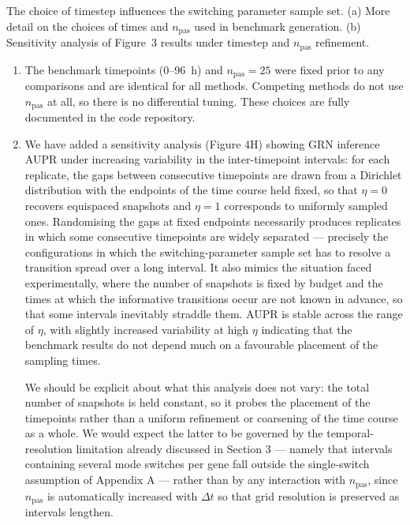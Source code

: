 \documentclass[11pt,a4paper]{article}
\newcounter{revtotal}   %
\newcounter{revlocal}   %
\newcommand{\currentreviewer}{}  %
\newcommand{\revcomment}[2]{%
  \stepcounter{revtotal}%
  \stepcounter{revlocal}%
  \edef\commentlabel{\currentreviewer.\arabic{revlocal}}%
  \begin{tcolorbox}[revstyle,
      title={\commentlabel\ $|$\ #1}]
    #2
  \end{tcolorbox}%
  \edef\lastcommentlabel{\commentlabel}%
}
\newcommand{\response}[1]{%
  \begin{tcolorbox}[respstyle,
      title={Response to \lastcommentlabel}]
    #1
  \end{tcolorbox}%
}
\begin{document}
\revcomment{Potential bias from timestep choice in benchmarks}{%
The choice of timestep influences the switching parameter sample set. (a) More detail on
the choices of times and $n_{\mathrm{pas}}$ used in benchmark generation. (b) Sensitivity
analysis of Figure~3 results under timestep and $n_{\mathrm{pas}}$ refinement.}
\response{%
\begin{enumerate}[label=(\alph*)]
  \item The benchmark timepoints (0--96~h) and $n_{\mathrm{pas}} = 25$ were fixed prior to
        any comparisons and are identical for all methods. Competing methods do not use
        $n_{\mathrm{pas}}$ at all, so there is no differential tuning. These choices are
        fully documented in the code repository.
  \item We have added a sensitivity analysis (Figure 4H) showing GRN inference AUPR
  under increasing variability in the inter-timepoint intervals: for each replicate, the gaps
  between consecutive timepoints are drawn from a Dirichlet distribution with the endpoints
  of the time course held fixed, so that $\eta = 0$ recovers equispaced snapshots and
  $\eta = 1$ corresponds to uniformly sampled ones. Randomising the gaps
  at fixed endpoints necessarily produces replicates in which some consecutive timepoints
  are widely separated — precisely the configurations in which the switching-parameter
  sample set has to resolve a transition spread over a long interval.
  It also mimics the situation faced experimentally, where the number of snapshots is fixed
  by budget and the times at which the informative transitions occur are not known in
  advance, so that some intervals inevitably straddle them. AUPR is stable across the range of $\eta$, with slightly increased variability at high $\eta$ indicating that the benchmark results do not depend much on a favourable
  placement of the sampling times.

  We should be explicit about what this analysis does not vary: the total number of
  snapshots is held constant, so it probes the placement of the timepoints rather than a
  uniform refinement or coarsening of the time course as a whole. We would expect the
  latter to be governed by the temporal-resolution limitation already discussed in
  Section 3 — namely that intervals containing several mode switches per gene fall outside
  the single-switch assumption of Appendix A — rather than by any interaction with
  $n_{\mathrm{pas}}$, since $n_{\mathrm{pas}}$ is automatically increased with $\Delta t$ so
  that grid resolution is preserved as intervals lengthen.
        
\end{enumerate}}
\end{document}
